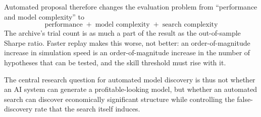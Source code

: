Automated proposal therefore changes the evaluation problem from ``performance and model
complexity'' to
\begin{equation}
  \boxed{\ \text{performance} \;+\; \text{model complexity} \;+\; \text{search complexity}\ }
\end{equation}
The archive's trial count is as much a part of the result as the out-of-sample Sharpe ratio.
Faster replay makes this worse, not better: an order-of-magnitude increase in simulation speed is an
order-of-magnitude increase in the number of hypotheses that can be tested, and the skill threshold
must rise with it.

The central research question for automated model discovery is thus not whether an AI system can
generate a profitable-looking model, but whether an automated search can discover economically
significant structure while controlling the false-discovery rate that the search itself induces.
